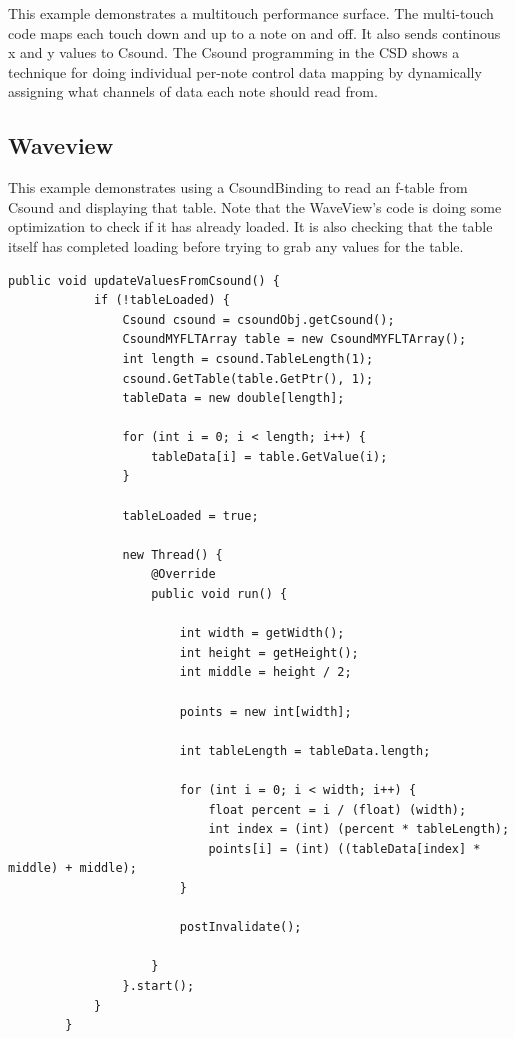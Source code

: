 \documentclass[11pt]{article}
\begin{document}
This example demonstrates a multitouch performance surface. The multi-touch code maps each touch down and up to a note on and off.  It also sends continous x and y values to Csound.  The Csound programming in the CSD shows a technique for doing individual per-note control data mapping by dynamically assigning what channels of data each note should read from. 

\subsection{Waveview}

This example demonstrates using a CsoundBinding to read an f-table from Csound and displaying that table.  Note that the WaveView's code is doing some optimization to check if it has already loaded.  It is also checking that the table itself has completed loading before trying to grab any values for the table. 

\begin{lstlisting}[caption=Waveview code demonstrating reading f-tables from Csound]
		public void updateValuesFromCsound() {
			if (!tableLoaded) {
				Csound csound = csoundObj.getCsound();
				CsoundMYFLTArray table = new CsoundMYFLTArray();
				int length = csound.TableLength(1);
				csound.GetTable(table.GetPtr(), 1);
				tableData = new double[length];

				for (int i = 0; i < length; i++) {
					tableData[i] = table.GetValue(i);
				}

				tableLoaded = true;

				new Thread() {
					@Override
					public void run() {

						int width = getWidth();
						int height = getHeight();
						int middle = height / 2;

						points = new int[width];

						int tableLength = tableData.length;

						for (int i = 0; i < width; i++) {
							float percent = i / (float) (width);
							int index = (int) (percent * tableLength);
							points[i] = (int) ((tableData[index] * middle) + middle);
						}

						postInvalidate();

					}
				}.start();
			}
		}
\end{lstlisting}



\end{document}
